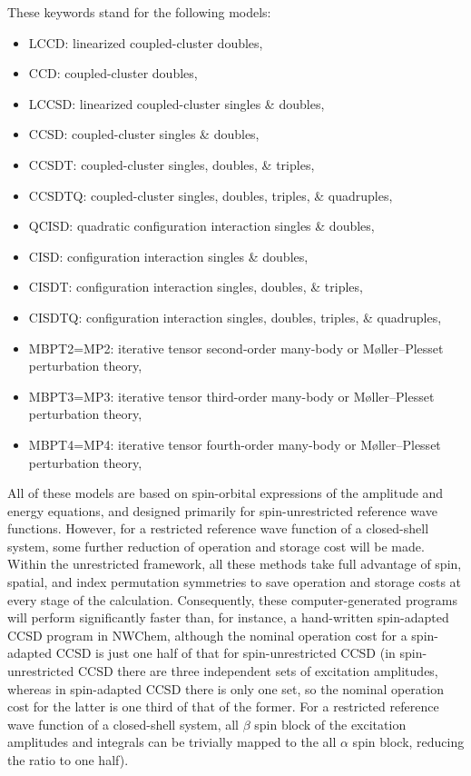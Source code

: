 These keywords stand for the following models:
\begin{itemize}
\item LCCD: linearized coupled-cluster doubles,
\item CCD: coupled-cluster doubles,
\item LCCSD: linearized coupled-cluster singles \& doubles,
\item CCSD: coupled-cluster singles \& doubles,
\item CCSDT: coupled-cluster singles, doubles, \& triples,
\item CCSDTQ: coupled-cluster singles, doubles, triples, \& quadruples,
\item QCISD: quadratic configuration interaction singles \& doubles,
\item CISD: configuration interaction singles \& doubles,
\item CISDT: configuration interaction singles, doubles, \& triples,
\item CISDTQ: configuration interaction singles, doubles, triples, \& quadruples,
\item MBPT2=MP2: iterative tensor second-order many-body or M\o ller--Plesset perturbation theory,
\item MBPT3=MP3: iterative tensor third-order many-body or M\o ller--Plesset perturbation theory,
\item MBPT4=MP4: iterative tensor fourth-order many-body or M\o ller--Plesset perturbation theory,
\end{itemize}

All of these models are based on spin-orbital expressions of the amplitude and energy equations, 
and designed primarily for spin-unrestricted reference wave functions.  However, for a restricted 
reference wave function of a closed-shell system, some further reduction of operation and storage
cost will be made.  Within the unrestricted framework, all these methods take full advantage
of spin, spatial, and index permutation symmetries to save operation and storage costs at every
stage of the calculation.  Consequently, these computer-generated programs will perform significantly
faster than, for instance, a hand-written spin-adapted CCSD program in NWChem, although the nominal 
operation cost for a spin-adapted CCSD is just one half of that for spin-unrestricted CCSD (in spin-unrestricted
CCSD there are three independent sets of excitation amplitudes, whereas in spin-adapted CCSD there
is only one set, so the nominal operation cost for the latter is one third of that of the former.  For 
a restricted reference wave function of a closed-shell system, all $\beta$ spin block of the excitation
amplitudes and integrals can be trivially mapped to the all $\alpha$ spin block, reducing the ratio
to one half).

